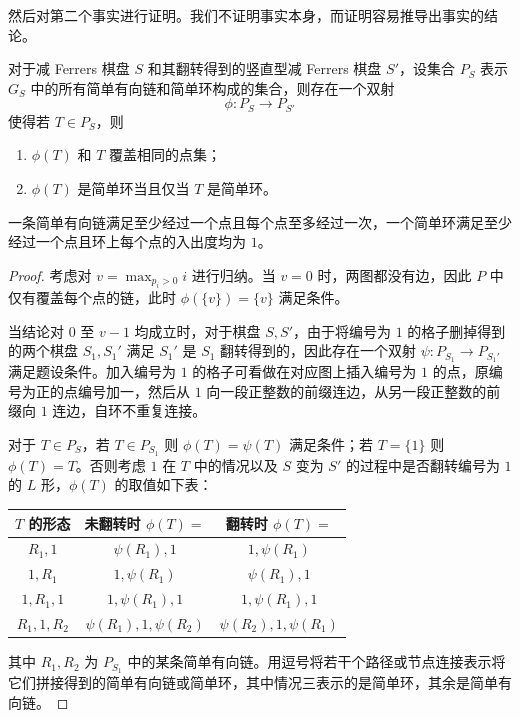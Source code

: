 \documentclass{noithesis}
\begin{document}
	然后对第二个事实进行证明。我们不证明事实本身，而证明容易推导出事实的结论。
	\begin{theorem}
		对于减 Ferrers 棋盘 $S$ 和其翻转得到的竖直型减 Ferrers 棋盘 $S'$，设集合 $P_S$ 表示 $G_S$ 中的所有简单有向链和简单环构成的集合，则存在一个双射 $$\phi:P_S \rightarrow P_{S'}$$ 使得若 $T \in P_S$，则
		\begin{enumerate}
			\item $\phi(T)$ 和 $T$ 覆盖相同的点集；
			\item $\phi(T)$ 是简单环当且仅当 $T$ 是简单环。
		\end{enumerate}
		
		一条简单有向链满足至少经过一个点且每个点至多经过一次，一个简单环满足至少经过一个点且环上每个点的入出度均为 $1$。
	\end{theorem}
	\begin{proof}
		考虑对 $v = \max_{p_i > 0} i$ 进行归纳。当 $v=0$ 时，两图都没有边，因此 $P$ 中仅有覆盖每个点的链，此时 $\phi(\{v\}) = \{v\}$ 满足条件。
		
		当结论对 $0$ 至 $v-1$ 均成立时，对于棋盘 $S,S'$，由于将编号为 $1$ 的格子删掉得到的两个棋盘 $S_1,S_1'$ 满足 $S_1'$ 是 $S_1$ 翻转得到的，因此存在一个双射 $\psi:P_{S_1} \rightarrow P_{S_1'}$ 满足题设条件。加入编号为 $1$ 的格子可看做在对应图上插入编号为 $1$ 的点，原编号为正的点编号加一，然后从 $1$ 向一段正整数的前缀连边，从另一段正整数的前缀向 $1$ 连边，自环不重复连接。
		
		对于 $T \in P_S$，若 $T \in P_{S_1}$ 则 $\phi(T) = \psi(T)$ 满足条件；若 $T = \{1\}$ 则 $\phi(T) = T$。否则考虑 $1$ 在 $T$ 中的情况以及 $S$ 变为 $S'$ 的过程中是否翻转编号为 $1$ 的 $L$ 形，$\phi(T)$ 的取值如下表：
		
		\begin{center}\begin{tabular}{|c|c|c|}
			\hline
			$T$ 的形态 & 未翻转时 $\phi(T) =$ & 翻转时 $\phi(T)=$ \\ \hline
			$R_1,1$ & $\psi(R_1) , 1$ & $1,\psi(R_1)$ \\ \hline
			$1,R_1$ & $1,\psi(R_1)$ & $\psi(R_1),1$ \\ \hline
			$1,R_1,1$ & $1,\psi(R_1),1$ & $1,\psi(R_1),1$ \\ \hline
			$R_1,1,R_2$ & $\psi(R_1),1,\psi(R_2)$ & $\psi(R_2),1,\psi(R_1)$ \\ \hline
		\end{tabular}\end{center}
		其中 $R_1,R_2$ 为 $P_{S_1}$ 中的某条简单有向链。用逗号将若干个路径或节点连接表示将它们拼接得到的简单有向链或简单环，其中情况三表示的是简单环，其余是简单有向链。
		

\end{proof}
\end{document}
